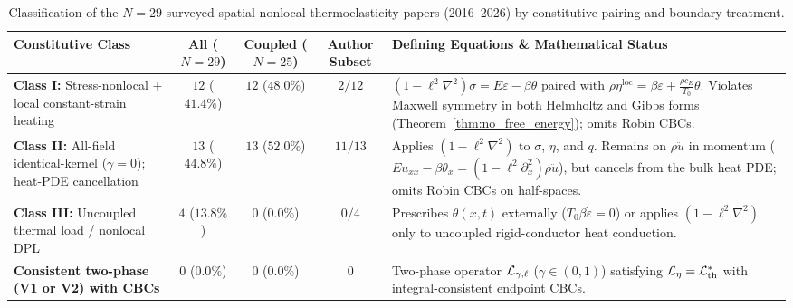\begin{table}[htbp]
  \centering
  \caption{Classification of the $N = 29$ surveyed spatial-nonlocal thermoelasticity papers (2016--2026) by constitutive pairing and boundary treatment.}\label{tab:census}
  \vspace{4pt}
  {\footnotesize
  \begin{tabular}{@{}p{3.2cm}cccp{6.0cm}@{}}
    \toprule
    \textbf{Constitutive Class} & \textbf{All ($N=29$)} & \textbf{Coupled ($N=25$)} & \textbf{Author Subset} & \textbf{Defining Equations \& Mathematical Status} \\
    \midrule
    \textbf{Class I:} Stress-nonlocal + local constant-strain heating & $12$ ($41.4\%$) & $12$ ($48.0\%$) & $2 / 12$ \cite{BarakGupta2023,GuptaKumar2023a} & $(1-\ell^2\nabla^2)\sigma = E\varepsilon - \beta\theta$ paired with $\rho\eta^{\mathrm{loc}} = \beta\varepsilon + \frac{\rho c_E}{T_0}\theta$. Violates Maxwell symmetry in both Helmholtz and Gibbs forms (Theorem~\ref{thm:no_free_energy}); omits Robin CBCs. \\
    \addlinespace[3pt]
    \textbf{Class II:} All-field identical-kernel ($\gamma=0$); heat-PDE cancellation & $13$ ($44.8\%$) & $13$ ($52.0\%$) & $11 / 13$ \cite{GuptaBarakDas2023b,GuptaBarakDas2024b} & Applies $(1-\ell^2\nabla^2)$ to $\sigma$, $\eta$, and $q$. Remains on $\rho\ddot{u}$ in momentum ($E u_{xx}-\beta\theta_x = (1-\ell^2\partial_x^2)\rho\ddot{u}$), but cancels from the bulk heat PDE; omits Robin CBCs on half-spaces. \\
    \addlinespace[3pt]
    \textbf{Class III:} Uncoupled thermal load / nonlocal DPL & $4$ ($13.8\%$) & $0$ ($0.0\%$) & $0 / 4$ & Prescribes $\theta(x,t)$ externally ($T_0\beta\dot{\varepsilon} = 0$) or applies $(1-\ell^2\nabla^2)$ only to uncoupled rigid-conductor heat conduction. \\
    \addlinespace[3pt]
    \textbf{Consistent two-phase (V1 or V2) with CBCs} & $0$ ($0.0\%$) & $0$ ($0.0\%$) & $0$ & Two-phase operator $\mathcal{L}_{\gamma,\ell}$ ($\gamma\in(0,1)$) satisfying $\mathcal{L}_\eta = \mathcal{L}_{\mathrm{th}}^*$ with integral-consistent endpoint CBCs. \\
    \bottomrule
  \end{tabular}}
\end{table}

